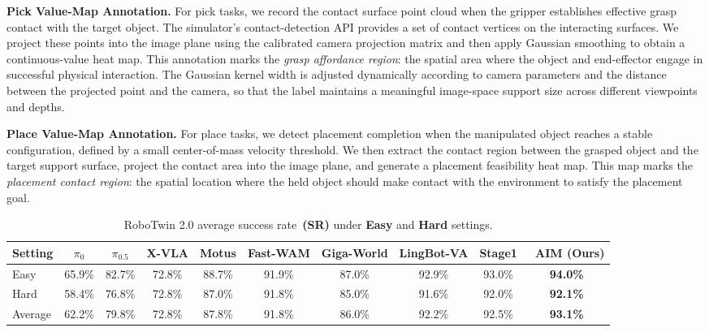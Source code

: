 \documentclass{article}
\begin{document}
\noindent\textbf{Pick Value-Map Annotation.}
For pick tasks, we record the contact surface point cloud when the gripper establishes effective grasp contact with the target object. The simulator's contact-detection API provides a set of contact vertices on the interacting surfaces. We project these points into the image plane using the calibrated camera projection matrix and then apply Gaussian smoothing to obtain a continuous-value heat map. This annotation marks the \emph{grasp affordance region}: the spatial area where the object and end-effector engage in successful physical interaction. The Gaussian kernel width is adjusted dynamically according to camera parameters and the distance between the projected point and the camera, so that the label maintains a meaningful image-space support size across different viewpoints and depths.

\noindent\textbf{Place Value-Map Annotation.}
For place tasks, we detect placement completion when the manipulated object reaches a stable configuration, defined by a small center-of-mass velocity threshold. We then extract the contact region between the grasped object and the target support surface, project the contact area into the image plane, and generate a placement feasibility heat map. This map marks the \emph{placement contact region}: the spatial location where the held object should make contact with the environment to satisfy the placement goal.

\begin{table}[t]
\centering
\caption{RoboTwin 2.0 average success rate~\textbf{(SR)} under \textbf{Easy} and \textbf{Hard} settings. }
\label{tab:robotwin_avg_clean_rand_methods_as_columns}
\small
\setlength{\tabcolsep}{4pt}
\begin{tabular}{lccccccccc}
\toprule
Setting & $\pi_{0}$ & $\pi_{0.5}$ & X-VLA & Motus & Fast-WAM & Giga-World & LingBot-VA & Stage1 & ~\textbf{AIM (Ours)} \\
\midrule
Easy & 65.9\% & 82.7\% & 72.8\% & 88.7\% & 91.9\% & 87.0\% & 92.9\% & 93.0\% & \textbf{94.0\%} \\
Hard & 58.4\% & 76.8\% & 72.8\% & 87.0\% & 91.8\% & 85.0\% & 91.6\% & 92.0\% & \textbf{92.1\%} \\
\midrule
Average & 62.2\% & 79.8\% & 72.8\% & 87.8\% & 91.8\% & 86.0\% & 92.2\% & 92.5\% & \textbf{93.1\%} \\
\bottomrule
\end{tabular}
\end{table}
\end{document}
